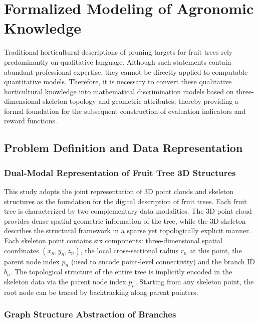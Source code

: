 \documentclass[12pt,a4paper,fontset=fandol]{ctexart}
\begin{document}
\section{Formalized Modeling of Agronomic Knowledge}\label{sec:formalization}

Traditional horticultural descriptions of pruning targets for fruit trees rely predominantly on qualitative language.
Although such statements contain abundant professional expertise, they cannot be directly applied to computable quantitative models.
Therefore, it is necessary to convert these qualitative horticultural knowledge into mathematical discrimination models based on three-dimensional skeleton topology and geometric attributes, thereby providing a formal foundation for the subsequent construction of evaluation indicators and reward functions.

\subsection{Problem Definition and Data Representation}\label{sec:formalization:problem}

\subsubsection{Dual-Modal Representation of Fruit Tree 3D Structures}

This study adopts the joint representation of 3D point clouds and skeleton structures as the foundation for the digital description of fruit trees. Each fruit tree is characterized by two complementary data modalities. The 3D point cloud provides dense spatial geometric information of the tree, while the 3D skeleton describes the structural framework in a sparse yet topologically explicit manner. Each skeleton point contains six components: three-dimensional spatial coordinates $(x_n, y_n, z_n)$,
the local cross-sectional radius $r_n$ at this point,
the parent node index $p_n$ (used to encode point-level connectivity)
and the branch ID $b_n$.
The topological structure of the entire tree is implicitly encoded in the skeleton data via the parent node index $p_n$. Starting from any skeleton point, the root node can be traced by backtracking along parent pointers.

\subsubsection{ Graph Structure Abstraction of Branches}
\end{document}
